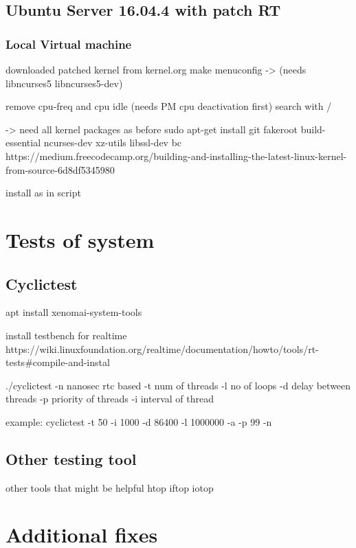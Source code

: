 \documentclass[]{scrartcl}
\begin{document}
\subsection{Ubuntu Server 16.04.4 with patch RT}

\subsubsection{Local Virtual machine}

downloaded patched kernel from kernel.org
make menuconfig
-> (needs libncurses5 libncurses5-dev)

remove cpu-freq and cpu idle (needs PM cpu deactivation first)
search with /

-> need all kernel packages as before
sudo apt-get install git fakeroot build-essential ncurses-dev xz-utils libssl-dev bc
https://medium.freecodecamp.org/building-and-installing-the-latest-linux-kernel-from-source-6d8df5345980

install as in script



\section{Tests of system}


\subsection{Cyclictest}

apt install xenomai-system-tools

install testbench for realtime
https://wiki.linuxfoundation.org/realtime/documentation/howto/tools/rt-tests#compile-and-instal



./cyclictest 
-n nanosec rtc based
-t num of threads
-l no of loops
-d delay between threads
-p priority of threads
-i interval of thread


example: 
cyclictest -t 50 -i 1000 -d 86400 -l 1000000 -a -p 99 -n

\subsection{Other testing tool}

other tools that might be helpful
htop
iftop
iotop


\section{Additional fixes}
\end{document}
